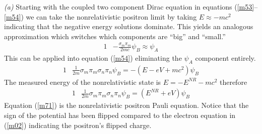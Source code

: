 \documentclass[]{article}
\numberwithin{equation}{subsection}
\begin{document}
\noindent\emph{(a)} Starting with the coupled two component Dirac equation in equations (\ref{m53}--\ref{m54}) we can take the nonrelativistic positron limit by taking $E\approx-mc^{2}$ indicating that the negative energy solutions dominate. This yields an analogous approximation which switches which components are ``big'' and ``small.''
\begin{alignat}{1}
  \label{m69} &-\frac{\sigma_{m}\pi_{m}}{2mc}\psi_{B}\approx\psi_{A}
\end{alignat}
This can be applied into equation (\ref{m54}) eliminating the $\psi_{A}$ component entirely.
\begin{alignat}{1}
  \label{m70}		&\frac{1}{2m}\sigma_{m}\pi_{m}\sigma_{n}\pi_{n}\psi_{B}=-(E-eV+mc^{2})\psi_{B}
\end{alignat}
The measured energy of the nonrelativistic state is $E=-E^{NR}-mc^{2}$ therefore
\begin{alignat}{1}
  \label{m71}		&\frac{1}{2m}\sigma_{m}\pi_{m}\sigma_{n}\pi_{n}\psi_{B}=(E^{NR}+eV)\psi_{B}
\end{alignat}
Equation (\ref{m71}) is the nonrelativistic positron Pauli equation. Notice that the sign of the potential has been flipped compared to the electron equation in (\ref{m02}) indicating the positron's flipped charge.\\
\end{document}
